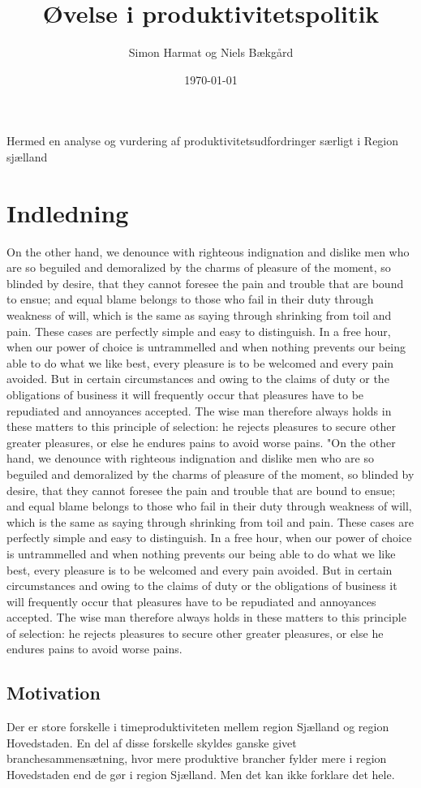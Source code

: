 \documentclass[a4paper, 12pt, titlepage]{article}
\author{Simon Harmat og Niels Bækgård}
\title{Øvelse i produktivitetspolitik}
\date{\today}
\begin{document}

Hermed en analyse og vurdering af produktivitetsudfordringer særligt i Region sjælland

\section{Indledning}
On the other hand, we denounce with righteous indignation and dislike men who are so beguiled and demoralized by the charms of pleasure of the moment, so blinded by desire, that they cannot foresee the pain and trouble that are bound to ensue; and equal blame belongs to those who fail in their duty through weakness of will, which is the same as saying through shrinking from toil and pain. These cases are perfectly simple and easy to distinguish. In a free hour, when our power of choice is untrammelled and when nothing prevents our being able to do what we like best, every pleasure is to be welcomed and every pain avoided. But in certain circumstances and owing to the claims of duty or the obligations of business it will frequently occur that pleasures have to be repudiated and annoyances accepted. The wise man therefore always holds in these matters to this principle of selection: he rejects pleasures to secure other greater pleasures, or else he endures pains to avoid worse pains. "On the other hand, we denounce with righteous indignation and dislike men who are so beguiled and demoralized by the charms of pleasure of the moment, so blinded by desire, that they cannot foresee the pain and trouble that are bound to ensue; and equal blame belongs to those who fail in their duty through weakness of will, which is the same as saying through shrinking from toil and pain. These cases are perfectly simple and easy to distinguish. In a free hour, when our power of choice is untrammelled and when nothing prevents our being able to do what we like best, every pleasure is to be welcomed and every pain avoided. But in certain circumstances and owing to the claims of duty or the obligations of business it will frequently occur that pleasures have to be repudiated and annoyances accepted. The wise man therefore always holds in these matters to this principle of selection: he rejects pleasures to secure other greater pleasures, or else he endures pains to avoid worse pains. 
\subsection{Motivation}
Der er store forskelle i timeproduktiviteten mellem region Sjælland og region Hovedstaden. En del af disse forskelle skyldes ganske givet branchesammensætning, hvor mere produktive brancher fylder mere i region Hovedstaden end de gør i region Sjælland. Men det kan ikke forklare det hele.
\end{document}
